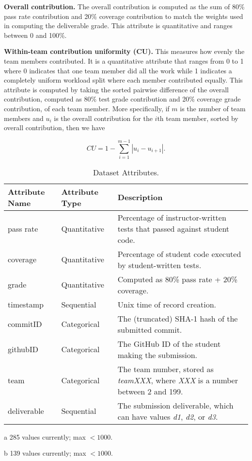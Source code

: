 \documentclass[../manifest.tex]{subfiles}
\begin{document}
\textbf{Overall contribution.} The overall contribution is computed as the sum of 80\% pass rate contribution and 20\% coverage contribution to match the weights used in computing the deliverable grade. This attribute is quantitative and ranges between 0 and 100\%.

\textbf{Within-team contribution uniformity (CU).} This measures how evenly the team members contributed. It is a quantitative attribute that ranges from 0 to 1 where 0 indicates that one team member did all the work while 1 indicates a completely uniform workload split where each member contributed equally. This attribute is computed by taking the sorted pairwise difference of the overall contribution, computed as 80\% test grade contribution and 20\% coverage grade contribution, of each team member. More specifically, if $m$ is the number of team members and $u_i$ is the overall contribution for the $i$th team member, sorted by overall contribution, then we have

\begin{equation}
  \label{eq:con-uniform}
  CU = 1-\sum_{i=1}^{m-1} |u_i - u_{i+1}|.
\end{equation}


\begin{table*}[t]
  \centering
  \begin{threeparttable}
      \caption{Dataset Attributes.}
      \label{tab:attributes}
  \begin{tabular*}{\textwidth}{lll}
    \hline
    \textbf{Attribute Name} & \textbf{Attribute Type} & \textbf{Description} \\
    \hline
    pass rate     & Quantitative & Percentage of instructor-written tests that passed against student code. \\
    coverage  & Quantitative & Percentage of student code executed by student-written tests. \\
    grade     & Quantitative & Computed as 80\% pass rate + 20\% coverage. \\
    timestamp      & Sequential   & Unix time of record creation. \\
    commitID      & Categorical  & The (truncated) SHA-1 hash of the submitted commit. \\
    githubID      & Categorical\tnote{a}  & The GitHub ID of the student making the submission. \\
    team           & Categorical\tnote{b}  & The team number, stored as \textit{teamXXX}, where \textit{XXX} is a number between 2 and 199. \\
    deliverable    & Sequential   & The submission deliverable, which can have values \textit{d1}, \textit{d2}, or \textit{d3}. \\
    \hline
  \end{tabular*}
  \begin{tablenotes}\footnotesize
    \item [a] 285 values currently; max $<1000$.
    \item [b] 139 values currently; max $<1000$.
\end{tablenotes}
\end{threeparttable}
\end{table*}
\end{document}
